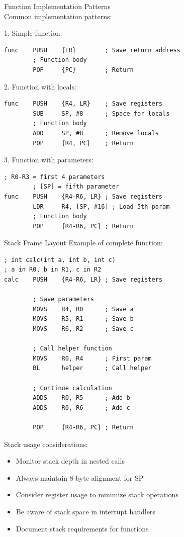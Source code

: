 \begin{KR}{Function Implementation Patterns}\\
Common implementation patterns:

1. Simple function:
\begin{lstlisting}[language=armasm, style=base]
func    PUSH    {LR}        ; Save return address
        ; Function body
        POP     {PC}        ; Return
\end{lstlisting}

2. Function with locals:
\begin{lstlisting}[language=armasm, style=base]
func    PUSH    {R4, LR}    ; Save registers
        SUB     SP, #8      ; Space for locals
        ; Function body
        ADD     SP, #8      ; Remove locals
        POP     {R4, PC}    ; Return
\end{lstlisting}

3. Function with parameters:
\begin{lstlisting}[language=armasm, style=base]
        ; R0-R3 = first 4 parameters
        ; [SP] = fifth parameter
func    PUSH    {R4-R6, LR} ; Save registers
        LDR     R4, [SP, #16] ; Load 5th param
        ; Function body
        POP     {R4-R6, PC} ; Return
\end{lstlisting}
\end{KR}

\begin{example2}{Stack Frame Layout}
Example of complete function:
\begin{lstlisting}[language=armasm, style=base]
; int calc(int a, int b, int c)
; a in R0, b in R1, c in R2
calc    PUSH    {R4-R6, LR} ; Save registers
        
        ; Save parameters
        MOVS    R4, R0      ; Save a
        MOVS    R5, R1      ; Save b
        MOVS    R6, R2      ; Save c
        
        ; Call helper function
        MOVS    R0, R4      ; First param
        BL      helper      ; Call helper
        
        ; Continue calculation
        ADDS    R0, R5      ; Add b
        ADDS    R0, R6      ; Add c
        
        POP     {R4-R6, PC} ; Return
\end{lstlisting}
\end{example2}

\begin{remark}
Stack usage considerations:
\begin{itemize}
  \item Monitor stack depth in nested calls
  \item Always maintain 8-byte alignment for SP
  \item Consider register usage to minimize stack operations
  \item Be aware of stack space in interrupt handlers
  \item Document stack requirements for functions
\end{itemize}
\end{remark}